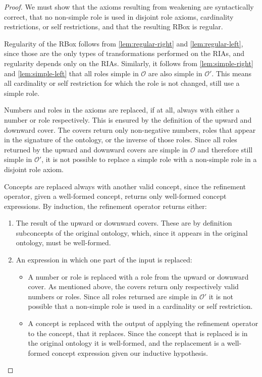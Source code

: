 \begin{proof}
We must show that the axioms resulting from weakening are syntactically correct, that no non-simple role is used in disjoint role axioms, cardinality restrictions, or self restrictions, and that the resulting RBox is regular.

Regularity of the RBox follows from \cref{lem:regular-right} and \cref{lem:regular-left}, since those are the only types of transformations performed on the RIAs, and regularity depends only on the RIAs. Similarly, it follows  from \cref{lem:simple-right} and \cref{lem:simple-left} that all roles simple in $\mathcal{O}$ are also simple in $\mathcal{O}'$. This means all cardinality or self restriction for which the role is not changed, still use a simple role.

Numbers and roles in the axioms are replaced, if at all, always with either a number or role respectively. This is ensured by the definition of the upward and downward cover. The covers return only non-negative numbers, roles that appear in the signature of the ontology, or the inverse of those roles. Since all roles returned by the upward and downward covers are simple in $\mathcal{O}$ and therefore still simple in $\mathcal{O}'$, it is not possible to replace a simple role with a non-simple role in a disjoint role axiom.

Concepts are replaced always with another valid concept, since the refinement operator, given a well-formed concept, returns only well-formed concept expressions.
By induction, the refinement operator returns either:

\begin{enumerate}[label=(\roman*)]
    \item The result of the upward or downward covers. These are by definition subconcepts of the original ontology, which, since it appears in the original ontology, must be well-formed.
    \item An expression in which one part of the input is replaced:
        \begin{itemize}
            \item A number or role is replaced with a role from the upward or downward cover. As mentioned above, the covers return only respectively valid numbers or roles. Since all roles returned are simple in $\mathcal{O}'$ it is not possible that a non-simple role is used in a cardinality or self restriction.
            \item A concept is replaced with the output of applying the refinement operator to the concept, that it replaces. Since the concept that is replaced is in the original ontology it is well-formed, and the replacement is a well-formed concept expression given our inductive hypothesis.
        \end{itemize}
\end{enumerate}
\end{proof}
